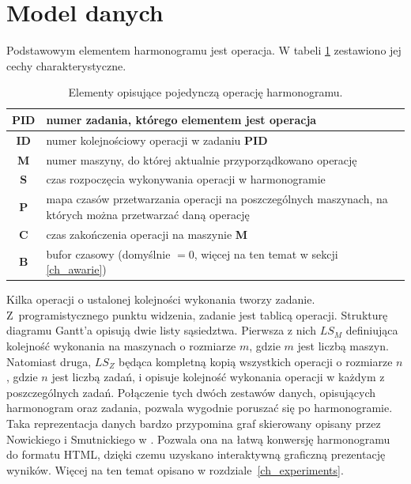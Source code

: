 \documentclass[archivemode]{mgr}
\begin{document}
\section{Model danych}
Podstawowym elementem harmonogramu jest operacja. W tabeli \ref{table_operation} zestawiono jej cechy charakterystyczne.
\begin{table}[ht]
\renewcommand{\arraystretch}{1.5}
\begin{tabular}{|c|l|}
    \hline
    \textbf{PID} & numer zadania, którego elementem jest operacja\\
    \hline
    \textbf{ID} & numer kolejnościowy operacji w zadaniu \textbf{PID}\\
    \hline
    \textbf{M} & numer maszyny, do której aktualnie przyporządkowano operację\\
    \hline
    \textbf{S} & czas rozpoczęcia wykonywania operacji w harmonogramie\\
    \hline
    \textbf{P} & \multicolumn{1}{m{14.25cm}|}{mapa czasów przetwarzania operacji na poszczególnych maszynach, na których można przetwarzać daną operację}\\
    \hline
    \textbf{C} & czas zakończenia operacji na maszynie \textbf{M}\\
    \hline
    \textbf{B} & bufor czasowy (domyślnie $=0$, więcej na ten temat w sekcji \ref{ch_awarie})\\
    \hline
\end{tabular}
\renewcommand{\arraystretch}{1}
\caption{Elementy opisujące pojedynczą operację harmonogramu.}
\label{table_operation}
\end{table}
Kilka operacji o ustalonej kolejności wykonania tworzy zadanie. Z~programistycznego punktu widzenia, zadanie jest tablicą operacji. Strukturę diagramu Gantt'a opisują dwie listy sąsiedztwa. Pierwsza z nich $LS_M$ definiująca kolejność wykonania na maszynach o rozmiarze $m$, gdzie $m$ jest liczbą maszyn. Natomiast druga, $LS_Z$ będąca kompletną kopią wszystkich operacji o rozmiarze $n$, gdzie $n$ jest liczbą zadań, i opisuje kolejność wykonania operacji w każdym z poszczególnych zadań. Połączenie tych dwóch zestawów danych, opisujących harmonogram oraz zadania, pozwala wygodnie poruszać się po harmonogramie. Taka reprezentacja danych bardzo przypomina graf skierowany opisany przez Nowickiego i Smutnickiego w \cite{Smutnicki96}. Pozwala ona na łatwą konwersję harmonogramu do formatu HTML, dzięki czemu uzyskano interaktywną graficzną prezentację wyników. Więcej na ten temat opisano w rozdziale~\ref{ch_experiments}.
%
\end{document}
